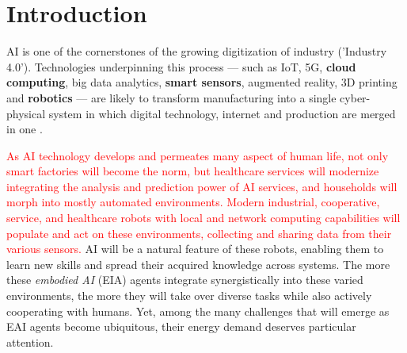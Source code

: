 \section{Introduction}\label{sec:intro}
\begin{fancyquotes}
	AI is one of the cornerstones of the growing digitization of industry ('Industry 4.0'). Technologies underpinning  this  process  ---  such as IoT,  5G,  \textbf{cloud  computing},  big  data  analytics,  \textbf{smart  sensors},  augmented  reality,  3D  printing  and  \textbf{robotics}  ---  are  likely  to  transform  manufacturing  into  a  single cyber-physical  system  in which digital  technology,  internet  and  production  are merged in one \cite{szczepanski_2019}.
\end{fancyquotes}
\textcolor{red}{As AI technology develops and permeates many aspect of human life, not only smart factories will become the norm, but healthcare services will modernize integrating the analysis and prediction power of AI services, and households will morph into mostly automated environments. Modern industrial, cooperative, service, and healthcare robots with local and network computing capabilities will populate and act on these environments, collecting and sharing data from their various sensors.} AI will be a natural feature of these robots, enabling them to learn new skills and spread their acquired knowledge across systems. The more these \emph{embodied AI} (EIA) agents integrate synergistically into these varied environments, the more they will take over diverse tasks while also actively cooperating with humans. Yet, among the many challenges that will emerge as EAI agents become ubiquitous, their energy demand deserves particular attention.


